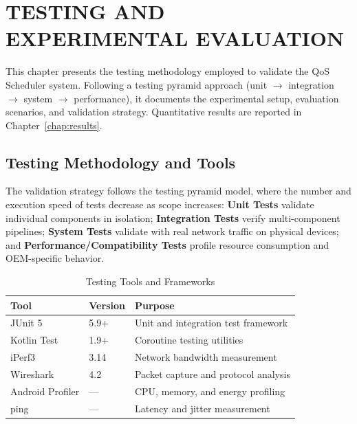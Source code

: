 
\chapter{TESTING AND EXPERIMENTAL EVALUATION}
\label{chap:testing}

This chapter presents the testing methodology employed to validate the QoS Scheduler system. Following a testing pyramid approach (unit $\rightarrow$ integration $\rightarrow$ system $\rightarrow$ performance), it documents the experimental setup, evaluation scenarios, and validation strategy. Quantitative results are reported in Chapter~\ref{chap:results}.

\section{Testing Methodology and Tools}
\label{sec:test_methodology}

The validation strategy follows the testing pyramid model, where the number and execution speed of tests decrease as scope increases: \textbf{Unit Tests} validate individual components in isolation; \textbf{Integration Tests} verify multi-component pipelines; \textbf{System Tests} validate with real network traffic on physical devices; and \textbf{Performance/Compatibility Tests} profile resource consumption and OEM-specific behavior.

\begin{table}[H]
\centering
\caption{Testing Tools and Frameworks}
\label{tab:test_tools}
\begin{tabularx}{\textwidth}{l l X}
\toprule
\textbf{Tool} & \textbf{Version} & \textbf{Purpose} \\
\midrule
JUnit 5         & 5.9+   & Unit and integration test framework \\
Kotlin Test     & 1.9+   & Coroutine testing utilities \\
iPerf3          & 3.14   & Network bandwidth measurement \\
Wireshark       & 4.2    & Packet capture and protocol analysis \\
Android Profiler & ---   & CPU, memory, and energy profiling \\
ping            & ---    & Latency and jitter measurement \\
\bottomrule
\end{tabularx}
\end{table}

